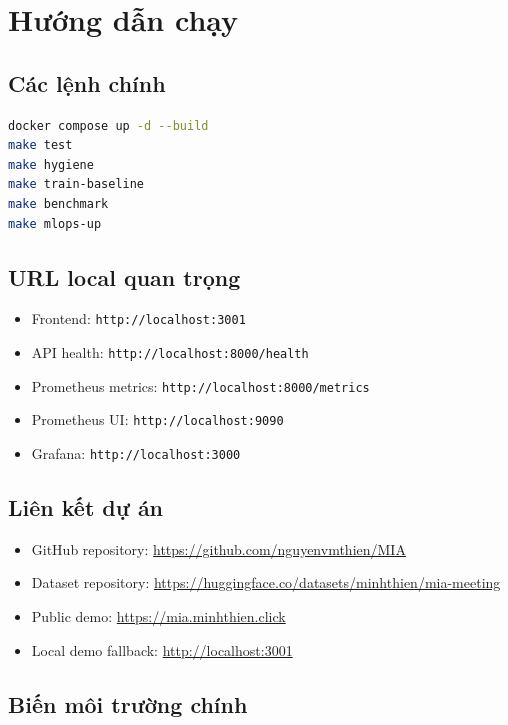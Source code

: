 \appendix

\chapter{Hướng dẫn chạy}

\section{Các lệnh chính}

\begin{lstlisting}[language=bash,caption={Các lệnh thường dùng}]
docker compose up -d --build
make test
make hygiene
make train-baseline
make benchmark
make mlops-up
\end{lstlisting}

\section{URL local quan trọng}

\begin{itemize}[leftmargin=*]
  \item Frontend: \texttt{http://localhost:3001}
  \item API health: \texttt{http://localhost:8000/health}
  \item Prometheus metrics: \texttt{http://localhost:8000/metrics}
  \item Prometheus UI: \texttt{http://localhost:9090}
  \item Grafana: \texttt{http://localhost:3000}
\end{itemize}

\section{Liên kết dự án}

\begin{itemize}[leftmargin=*]
  \item GitHub repository: \url{https://github.com/nguyenvmthien/MIA}
  \item Dataset repository: \url{https://huggingface.co/datasets/minhthien/mia-meeting}
  \item Public demo: \url{https://mia.minhthien.click}
  \item Local demo fallback: \url{http://localhost:3001}
\end{itemize}

\section{Biến môi trường chính}

